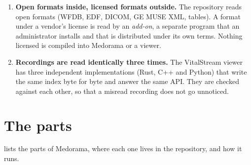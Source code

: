 \begin{enumerate}
  and searched, is decided on the server. The pages draw what they are sent,
  with no build step and no third-party code.
\item \textbf{Open formats inside, licensed formats outside.} The repository reads open formats
  (WFDB, EDF, DICOM, GE MUSE XML, tables). A format under a vendor's license is read by an
  \emph{add-on}, a separate program that an administrator installs and that is distributed under
  its own terms. Nothing licensed is compiled into Medorama or a viewer.
\item \textbf{Recordings are read identically three times.} The VitalStream viewer has three
  independent implementations (Rust, C++ and Python) that write the same index byte for byte and
  answer the same API. They are checked against each other, so that a misread recording does not
  go unnoticed.
\end{enumerate}

\section{The parts}
\label{sec:architecture-parts}

 lists the parts of Medorama, where each one lives in the
repository, and how it runs.

